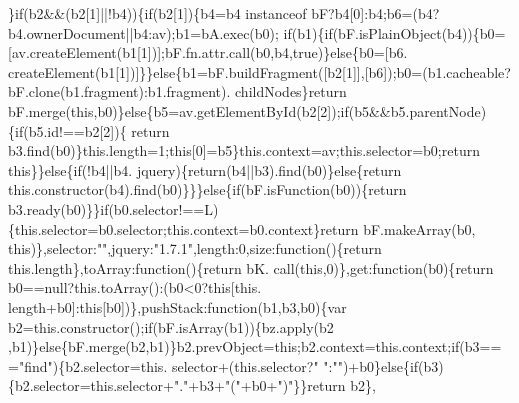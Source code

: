 \begin{DoxyCode}
      \}\textcolor{keywordflow}{if}(b2&&(b2[1]||!b4))\{\textcolor{keywordflow}{if}(b2[1])\{b4=b4 instanceof bF?b4[0]:b4;b6=(b4?b4.ownerDocument||b4:av);b1=bA.exec(b0);\textcolor{keywordflow}{
      if}(b1)\{\textcolor{keywordflow}{if}(bF.isPlainObject(b4))\{b0=[av.createElement(b1[1])];bF.fn.attr.call(b0,b4,\textcolor{keyword}{true})\}\textcolor{keywordflow}{else}\{b0=[b6.
      createElement(b1[1])]\}\}\textcolor{keywordflow}{else}\{b1=bF.buildFragment([b2[1]],[b6]);b0=(b1.cacheable?bF.clone(b1.fragment):b1.fragment).
      childNodes\}\textcolor{keywordflow}{return} bF.merge(\textcolor{keyword}{this},b0)\}\textcolor{keywordflow}{else}\{b5=av.getElementById(b2[2]);\textcolor{keywordflow}{if}(b5&&b5.parentNode)\{\textcolor{keywordflow}{if}(b5.id!==b2[2])\{\textcolor{keywordflow}{
      return} b3.find(b0)\}this.length=1;\textcolor{keyword}{this}[0]=b5\}this.context=av;this.selector=b0;\textcolor{keywordflow}{return} \textcolor{keyword}{this}\}\}\textcolor{keywordflow}{else}\{\textcolor{keywordflow}{if}(!b4||b4.
      jquery)\{\textcolor{keywordflow}{return}(b4||b3).find(b0)\}\textcolor{keywordflow}{else}\{\textcolor{keywordflow}{return} this.constructor(b4).find(b0)\}\}\}\textcolor{keywordflow}{else}\{\textcolor{keywordflow}{if}(bF.isFunction(b0))\{\textcolor{keywordflow}{return} 
      b3.ready(b0)\}\}\textcolor{keywordflow}{if}(b0.selector!==L)\{this.selector=b0.selector;this.context=b0.context\}\textcolor{keywordflow}{return} bF.makeArray(b0,\textcolor{keyword}{
      this})\},selector:\textcolor{stringliteral}{""},jquery:\textcolor{stringliteral}{"1.7.1"},length:0,size:\textcolor{keyword}{function}()\{\textcolor{keywordflow}{return} this.length\},toArray:\textcolor{keyword}{function}()\{\textcolor{keywordflow}{return} bK.
      call(\textcolor{keyword}{this},0)\},\textcolor{keyword}{get}:\textcolor{keyword}{function}(b0)\{\textcolor{keywordflow}{return} b0==null?this.toArray():(b0<0?this[this.
      length+b0]:this[b0])\},pushStack:function(b1,b3,b0)\{var b2=this.constructor();\textcolor{keywordflow}{if}(bF.isArray(b1))\{bz.apply(b2
      ,b1)\}\textcolor{keywordflow}{else}\{bF.merge(b2,b1)\}b2.prevObject=\textcolor{keyword}{this};b2.context=this.context;\textcolor{keywordflow}{if}(b3===\textcolor{stringliteral}{"find"})\{b2.selector=this.
      selector+(this.selector?\textcolor{stringliteral}{" "}:\textcolor{stringliteral}{""})+b0\}\textcolor{keywordflow}{else}\{\textcolor{keywordflow}{if}(b3)\{b2.selector=this.selector+\textcolor{stringliteral}{"."}+b3+\textcolor{stringliteral}{"("}+b0+\textcolor{stringliteral}{")"}\}\}\textcolor{keywordflow}{return} b2\},

\end{DoxyCode}
